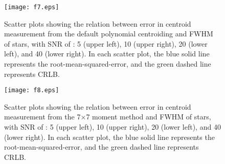 \documentclass[12pt, preprint]{aastex}
\begin{document}
\begin{figure}[!htb]
  \texttt{[image: f7.eps]}
\endminipage
\caption{Scatter plots showing the relation between error in centroid measurement
from the default polynomial centroiding and FWHM of stars, with SNR  of 
: 5 (upper left), 10 (upper right), 20 (lower left), and 40 (lower right). In each
scatter plot, the blue solid
 line represents the root-mean-squared-error, and the green dashed line represents CRLB.}\label{7}
\end{figure}

\begin{figure}[!htb]
  \texttt{[image: f8.eps]}
\endminipage
\caption{Scatter plots showing the relation between error in centroid measurement
from the 7$\times$7 moment method and FWHM of stars, with SNR of : 5 (upper left),
10 (upper right), 20 (lower left), and 40 (lower right). In each scatter plot, 
the blue solid
 line represents the root-mean-squared-error, and the green dashed line represents CRLB.}\label{8}
\end{figure}
\end{document}
